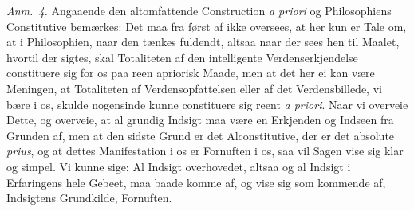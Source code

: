 \documentclass[12pt,a4paper]{book}
\newcommand{\apage}[1]{\marginnote{\footnotesize\textit{[#1]}}}
\begin{document}
  \apage{52}
{\small

\emph{Anm.~4.} Angaaende den altomfattende Construction \textit{a priori} og
Philosophiens Constitutive bemærkes: Det maa fra først af ikke oversees, at her kun
er Tale om, at i Philosophien, naar den tænkes fuldendt, altsaa naar der sees hen
til Maalet, hvortil der sigtes, skal Totaliteten af den intelligente
Verdenserkjendelse constituere sig for os paa reen apriorisk Maade, men at det her
ei kan være Meningen, at Totaliteten af Verdensopfattelsen eller af det
Verdensbillede, vi bære i os, skulde nogensinde kunne constituere sig reent
\textit{a priori}. Naar vi overveie Dette, og overveie, at al grundig Indsigt maa
være en Erkjenden og Indseen fra Grunden af, men at den sidste Grund er det
Alconstitutive, der er det absolute \textit{prius}, og at dettes Manifestation i os
er Fornuften i os, saa vil Sagen vise sig klar og simpel. Vi kunne sige: Al Indsigt
overhovedet, altsaa og al Indsigt i Erfaringens hele Gebeet, maa baade komme af, og
vise sig som kommende af, Indsigtens Grundkilde, Fornuften.\par}
\end{document}
